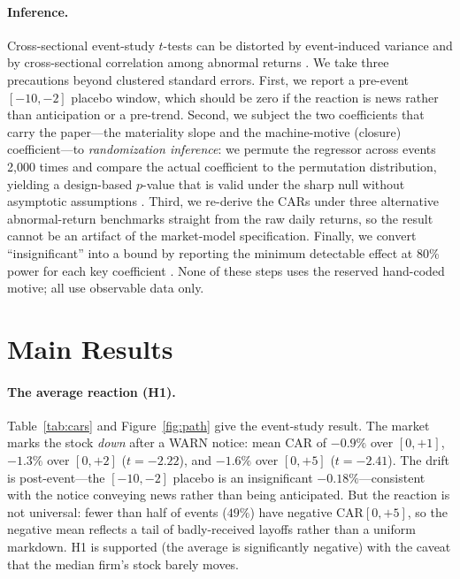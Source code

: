\documentclass[12pt]{article}
\begin{document}
\paragraph{Inference.} Cross-sectional event-study $t$-tests can be distorted by
event-induced variance and by cross-sectional correlation among abnormal returns
\citep{boehmer1991,corrado1989,kolari2010}. We take three precautions beyond
clustered standard errors. First, we report a pre-event $[-10,-2]$ placebo window,
which should be zero if the reaction is news rather than anticipation or a
pre-trend. Second, we subject the two coefficients that carry the paper---the
materiality slope and the machine-motive (closure) coefficient---to
\emph{randomization inference}: we permute the regressor across events 2{,}000
times and compare the actual coefficient to the permutation distribution, yielding
a design-based $p$-value that is valid under the sharp null without asymptotic
assumptions \citep{young2019}. Third, we re-derive the CARs under three
alternative abnormal-return benchmarks straight from the raw daily returns, so the
result cannot be an artifact of the market-model specification. Finally, we convert
``insignificant'' into a bound by reporting the minimum detectable effect at 80\%
power for each key coefficient \citep{abadie2020}. None of these steps uses the
reserved hand-coded motive; all use observable data only.

\section{Main Results}\label{sec:res}
\paragraph{The average reaction (H1).} Table~\ref{tab:cars} and
Figure~\ref{fig:path} give the event-study result. The market marks the stock
\emph{down} after a WARN notice: mean CAR of $-0.9\%$ over $[0,+1]$, $-1.3\%$ over
$[0,+2]$ ($t=-2.22$), and $-1.6\%$ over $[0,+5]$ ($t=-2.41$). The drift is
post-event---the $[-10,-2]$ placebo is an insignificant $-0.18\%$---consistent
with the notice conveying news rather than being anticipated. But the reaction is
not universal: fewer than half of events ($49\%$) have negative CAR$[0,+5]$, so
the negative mean reflects a tail of badly-received layoffs rather than a
uniform markdown. H1 is supported (the average is significantly negative) with the
caveat that the median firm's stock barely moves.
\end{document}
